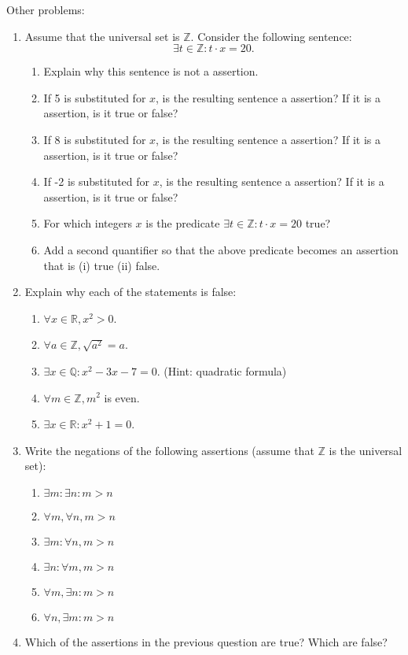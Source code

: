 \documentclass[letterpaper,12pt]{article}
\newcommand{\R}{\mathbb{R}}
\begin{document}
Other problems:
\begin{enumerate}
\item Assume that the universal set is $\mathbb{Z}$. Consider the following sentence:
\[
\exists t\in\mathbb{Z} : t\cdot x = 20.
\]
\begin{enumerate}
\item Explain why this sentence is not a assertion.
\item If 5 is substituted for $x$, is the resulting sentence a assertion? If it is a assertion, is it true or false?
\item If 8 is substituted for $x$, is the resulting sentence a assertion? If it is a assertion, is it true or false?
\item If -2 is substituted for $x$, is the resulting sentence a assertion? If it is a assertion, is it true or false?
\item For which integers $x$ is the predicate $\exists t\in\mathbb{Z} :  t\cdot x = 20$ true?
\item Add a second quantifier so that the above predicate becomes an assertion that is (i) true (ii) false.
\end{enumerate}
\item Explain why each of the statements is false:
\begin{enumerate}
\item $\forall x\in\R, x^2>0$.
\item $\forall a\in\mathbb{Z}, \sqrt{a^2} = a$.
\item $\exists x\in\mathbb{Q}: x^2-3x-7=0$. (Hint: quadratic formula)
\item $\forall m\in\mathbb{Z}, m^2$ is even.
\item $\exists x\in\R: x^2+1=0$.
\end{enumerate}
\item Write the negations of the following assertions (assume that $\mathbb{Z}$ is the universal set):
\begin{enumerate}
\item $\exists m: \exists n: m>n$
\item $\forall m, \forall n, m>n$
\item $\exists m: \forall n, m>n$
\item $\exists n: \forall m, m>n$
\item $\forall m, \exists n: m>n$
\item $\forall n, \exists m: m>n$
\end{enumerate}
\item Which of the assertions in the previous question are true? Which are false?
\end{enumerate}
\end{document}
